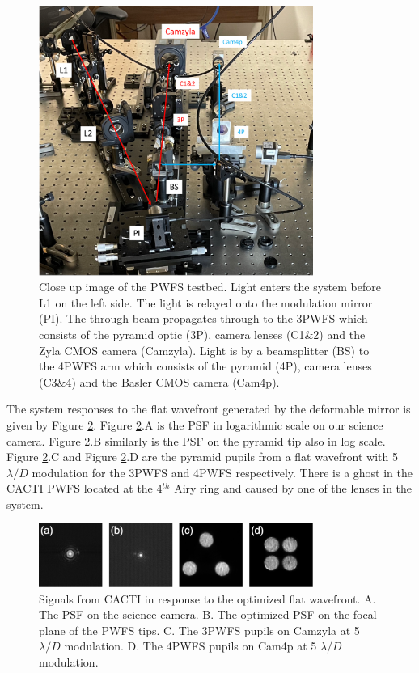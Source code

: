 \begin{figure}
    \centering
    \includegraphics[width=0.8\textwidth]{Chapter Materials/Chapter Five Materials/PWFStestbed.png}
    \caption{Close up image of the PWFS testbed. Light enters the system before L1 on the left side. The light is relayed onto the modulation mirror (PI). The through beam propagates through to the 3PWFS which consists of the pyramid optic (3P), camera lenses (C1$\&$2) and the Zyla CMOS camera (Camzyla). Light is by a beamsplitter (BS) to the 4PWFS arm which consists of the pyramid (4P), camera lenses (C3$\&$4) and the Basler CMOS camera (Cam4p).  }
    \label{fig:PWFStestbed}
\end{figure}


 The system responses to the flat wavefront generated by the deformable mirror is given by Figure \ref{fig:flatCACTI}. Figure \ref{fig:flatCACTI}.A is the PSF in logarithmic scale on our science camera. Figure \ref{fig:flatCACTI}.B similarly is the PSF on the pyramid tip also in log scale. Figure  \ref{fig:flatCACTI}.C and Figure \ref{fig:flatCACTI}.D are the pyramid pupils from a flat wavefront with 5$\lambda/D$ modulation for the 3PWFS and 4PWFS respectively. There is a ghost in the CACTI PWFS located at the 4$^{th}$ Airy ring and caused by one of the lenses in the system. 

\begin{figure}
    \centering
    \includegraphics[width=0.8\textwidth]{Chapter Materials/Chapter Five Materials/flatCACTI.png}
    \caption{Signals from CACTI in response to the optimized flat wavefront. A. The PSF on the science camera. B. The optimized PSF on the focal plane of the PWFS tips. C. The 3PWFS pupils on Camzyla at 5 $\lambda/D$ modulation. D. The 4PWFS pupils on Cam4p at 5 $\lambda/D$ modulation.}
    \label{fig:flatCACTI}
\end{figure}


